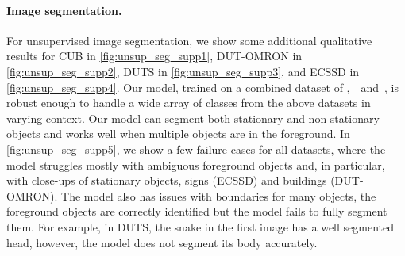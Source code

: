 \paragraph{Image segmentation.}
For unsupervised image segmentation, we show some additional qualitative results for CUB in \cref{fig:unsup_seg_supp1}, DUT-OMRON in \cref{fig:unsup_seg_supp2}, DUTS in \cref{fig:unsup_seg_supp3}, and ECSSD in \cref{fig:unsup_seg_supp4}. Our model, trained on a combined dataset of \DAVIS,~\FBMS~and~\ST, is robust enough to handle a wide array of classes from the above datasets in varying context. Our model can segment both stationary and non-stationary objects and works well when multiple objects are in the foreground.
In \cref{fig:unsup_seg_supp5}, we show a few failure cases for all datasets, where the model struggles mostly with ambiguous foreground objects and, in particular, with close-ups of stationary objects, \eg signs (ECSSD) and buildings (DUT-OMRON).
The model also has issues with boundaries for many objects, \ie the foreground objects are correctly identified but the model fails to fully segment them. 
For example, in DUTS, the snake in the first image has a well segmented head, however, the model does not segment its body accurately.



